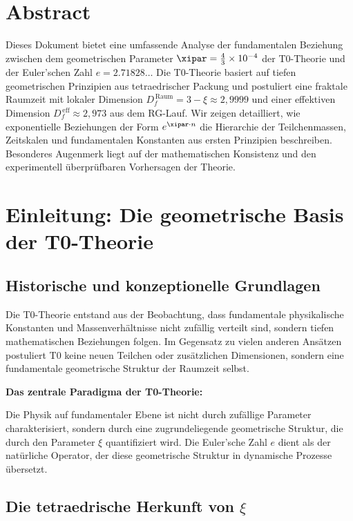 \section*{Abstract}
		Dieses Dokument bietet eine umfassende Analyse der fundamentalen Beziehung zwischen dem geometrischen Parameter $\xipar = \frac{4}{3} \times 10^{-4}$ der T0-Theorie und der Euler'schen Zahl $e = 2.71828\ldots$ Die T0-Theorie basiert auf tiefen geometrischen Prinzipien aus tetraedrischer Packung und postuliert eine fraktale Raumzeit mit lokaler Dimension $D_f^{\,\text{Raum}} = 3 - \xi \approx 2{,}9999$ und einer effektiven Dimension $D_f^{\,\text{eff}} \approx 2{,}973$ aus dem RG-Lauf. Wir zeigen detailliert, wie exponentielle Beziehungen der Form $e^{\xipar \cdot n}$ die Hierarchie der Teilchenmassen, Zeitskalen und fundamentalen Konstanten aus ersten Prinzipien beschreiben. Besonderes Augenmerk liegt auf der mathematischen Konsistenz und den experimentell überprüfbaren Vorhersagen der Theorie.

	
	
	\section{Einleitung: Die geometrische Basis der T0-Theorie}
	
	\subsection{Historische und konzeptionelle Grundlagen}
	
	Die T0-Theorie entstand aus der Beobachtung, dass fundamentale physikalische Konstanten und Massenverhältnisse nicht zufällig verteilt sind, sondern tiefen mathematischen Beziehungen folgen. Im Gegensatz zu vielen anderen Ansätzen postuliert T0 keine neuen Teilchen oder zusätzlichen Dimensionen, sondern eine fundamentale geometrische Struktur der Raumzeit selbst.
	
	\begin{erkenntnis}
		\textbf{Das zentrale Paradigma der T0-Theorie:}
		
		Die Physik auf fundamentaler Ebene ist nicht durch zufällige Parameter charakterisiert, sondern durch eine zugrundeliegende geometrische Struktur, die durch den Parameter $\xi$ quantifiziert wird. Die Euler'sche Zahl $e$ dient als der natürliche Operator, der diese geometrische Struktur in dynamische Prozesse übersetzt.
	\end{erkenntnis}
	
	\subsection{Die tetraedrische Herkunft von $\xi$}
	
